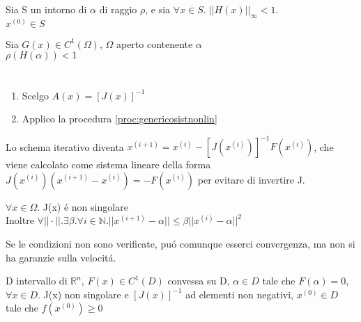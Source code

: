 \askip

Sia S un intorno di $ \alpha $ di raggio $ \rho $, e sia $ \forall x \in S. \; || H(x) ||_{\infty} < 1 $.\\
 $ x^{(0)} \in S $

\askip

Sia $ G(x) \in C^1(\Omega) $, $ \Omega $ aperto contenente $ \alpha $ \\
 $ \rho(H(\alpha)) < 1 $

\section{}
\begin{proc}\label{proc:newtonraphson}
\begin{enumerate}
\item Scelgo $ A(x) = [J(x)]^{-1} $
\item Applico la procedura \ref{proc:genericosistnonlin}
\end{enumerate}
\end{proc}

Lo schema iterativo diventa $ x^{(i+1)} = x^{(i)} - [J(x^{(i)})]^{-1}F(x^{(i)}) $, che viene calcolato come sistema lineare della forma $ J(x^{(i)})(x^{(i+1)} - x^{(i)}) = -F(x^{(i)}) $ per evitare di invertire J.

\askip

 $ \forall x \in \Omega. $ J(x) \'e non singolare \\
Inoltre $ \forall ||\cdot||. \exists \beta. \forall i \in \mathbb{N}. ||x^{(i+1)} - \alpha|| \leq \beta || x^{(i)} - \alpha ||^2 $

Se le condizioni non sono verificate, pu\'o comunque esserci convergenza, ma non si ha garanzie sulla velocit\'a.

\askip

 D intervallo di $ \mathbb{R}^n $, $ F(x) \in C^1(D) $ convessa su D, $ \alpha \in D $ tale che $ F(\alpha) = 0 $, $ \forall x \in D. $ J(x) non singolare e $ \left[ J(x) \right]^{-1} $ ad elementi non negativi, $ x^{(0)} \in D $ tale che $ f(x^{(0)}) \geq 0 $